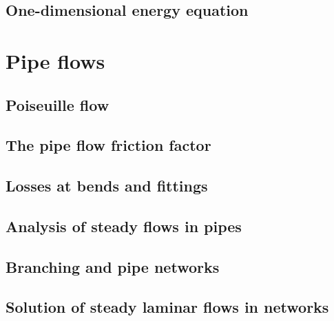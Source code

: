 \documentclass[a4paper,11pt]		{report}
\begin{document}
\section{One-dimensional energy equation}


\chapter{Pipe flows}
\label{ch.pipe}

\section{Poiseuille flow}

\section{The pipe flow friction factor}

\section{Losses at bends and fittings}

\section{Analysis of steady flows in pipes}


\section{Branching and pipe networks}

\section{Solution of steady laminar flows in networks}





\end{document}
